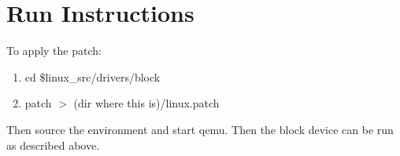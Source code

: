 \documentclass[letterpaper,10pt,draftclsnofoot,onecolumn,titlepage]{IEEEtran}
\begin{document}
\section{Run Instructions}
To apply the patch:
\begin{enumerate}
   \item cd \$linux\_src/drivers/block
   \item patch $>$ (dir where this is)/linux.patch
\end{enumerate}

Then source the environment and start qemu. Then the block device can be run as described above.
\end{document}
